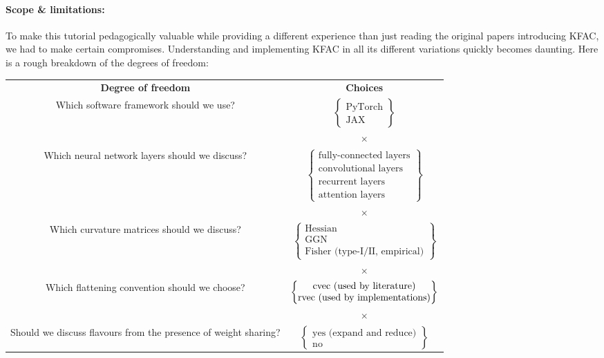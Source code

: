\paragraph{Scope \& limitations:} To make this tutorial pedagogically valuable while providing a different experience than just reading the original papers introducing KFAC, we had to make certain compromises.
Understanding and implementing KFAC in all its different variations quickly becomes daunting.
Here is a rough breakdown of the degrees of freedom:
\begin{center}

  \begin{tabular}[!h]{cc}
    \textbf{Degree of freedom}
    &
      \textbf{Choices}
    \\
    Which software framework should we use?
    &
      $
      \begin{Bmatrix}
        \text{PyTorch}
        \\
        \text{JAX}
      \end{Bmatrix}
      $
    \\
    & $\times$
    \\
    Which neural network layers should we discuss?
    &
      $
      \begin{Bmatrix}
        \text{fully-connected layers}
        \\
        \text{convolutional layers}
        \\
        \text{recurrent layers}
        \\
        \text{attention layers}
      \end{Bmatrix}
      $
    \\
    & $\times$
    \\
    Which curvature matrices should we discuss?
    &
      $
      \begin{Bmatrix}
        \text{Hessian}
        \\
        \text{GGN}
        \\
        \text{Fisher (type-I/II, empirical)}
      \end{Bmatrix}
      $
    \\
    & $\times$
    \\
    Which flattening convention should we choose?
    &
      $
      \begin{Bmatrix}
        \operatorname{cvec}\,\text{(used by literature)}
        \\
        \operatorname{rvec}\,\text{(used by implementations)}
      \end{Bmatrix}
      $
    \\
    & $\times$
    \\
    Should we discuss flavours from the presence of weight sharing?
    &
      $
      \begin{Bmatrix}
        \text{yes (expand and reduce)}
        \\
        \text{no}
      \end{Bmatrix}
      $
  \end{tabular}
\end{center}
